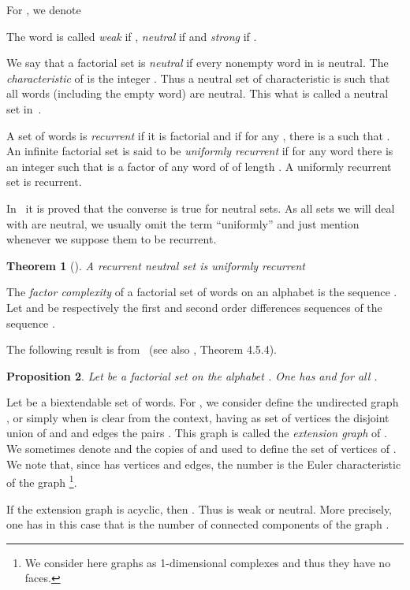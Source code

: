 \documentclass[preprint,12pt]{elsarticle}
\newtheorem{theorem}{Theorem}
\newtheorem{proposition}[theorem]{Proposition}
\numberwithin{theorem}{section}
\numberwithin{equation}{section}
\numberwithin{figure}{section}
\numberwithin{table}{section}
\begin{document}
For , we denote 

The word  is called \emph{weak} if , \emph{neutral} if  and \emph{strong} if .

We say that a factorial set  is \emph{neutral} if every nonempty word in  is neutral.
The \emph{characteristic} of  is the integer .
Thus a neutral set of characteristic  is such that all words (including the empty word) are neutral. This what is called a neutral
set in~\cite{BertheDeFeliceDolceLeroyPerrinReutenauerRindone2013a}.

A set of words  is \emph{recurrent} if it is factorial and if for any , there is a  such that .
An infinite factorial set is said to be \emph{uniformly recurrent} if for any word  there is an integer  such that  is a factor of any word of  of length .
A uniformly recurrent set is recurrent.

In~\cite{DolcePerrin2016} it is proved that the converse is true for neutral sets.
As all sets we will deal with are neutral, we usually omit the term ``uniformly'' and just mention whenever we suppose them to be recurrent.

\begin{theorem}[\cite{DolcePerrin2016}]
\label{theo:recurrentur}
A recurrent neutral set is uniformly recurrent
\end{theorem}

The \emph{factor complexity} of a factorial set  of words on an alphabet  is the sequence .
Let  and  be respectively the first and second order differences sequences of the sequence . 

The following result is from~\cite{Cassaigne1997} (see also \cite{BertheRigo2010}, Theorem 4.5.4).

\begin{proposition}
\label{propCANT}
Let  be a factorial set on the alphabet .
One has  and  for all .
\end{proposition}


Let  be a biextendable set of words.
For , we consider define the undirected graph , or simply  when  is clear from the context, having as set of vertices the disjoint union of  and  and edges the pairs .
This graph is called the \emph{extension graph} of .
We sometimes denote  and  the copies of  and  used to define the set of vertices of .
We note that, since  has  vertices and  edges, the number  is the Euler characteristic of the graph \footnote{We consider here graphs as 1-dimensional complexes and thus they have no faces.}.

If the extension graph  is acyclic, then .
Thus  is weak or neutral.
More precisely, one has in this case that  is the number of connected components of the graph .
\end{document}

